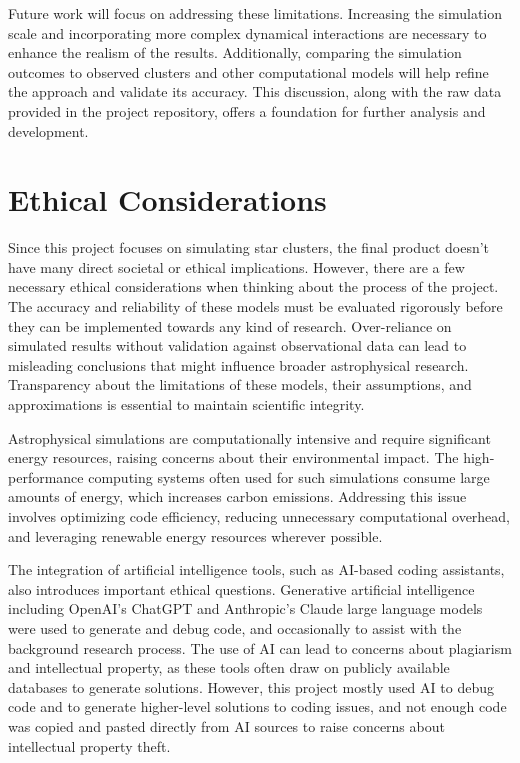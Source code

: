 \documentclass[10pt,twocolumn]{article}
\begin{document}
Future work will focus on addressing these limitations. Increasing the simulation scale and incorporating more complex dynamical interactions are necessary to enhance the realism of the results. Additionally, comparing the simulation outcomes to observed clusters and other computational models will help refine the approach and validate its accuracy. This discussion, along with the raw data provided in the project repository, offers a foundation for further analysis and development.

\section{Ethical Considerations}
Since this project focuses on simulating star clusters, the final product doesn’t have many direct societal or ethical implications. However, there are a few necessary ethical considerations when thinking about the process of the project. The accuracy and reliability of these models must be evaluated rigorously before they can be implemented towards any kind of research. Over-reliance on simulated results without validation against observational data can lead to misleading conclusions that might influence broader astrophysical research. Transparency about the limitations of these models, their assumptions, and approximations is essential to maintain scientific integrity.

Astrophysical simulations are computationally intensive and require significant energy resources, raising concerns about their environmental impact. The high-performance computing systems often used for such simulations consume large amounts of energy, which increases carbon emissions. Addressing this issue involves optimizing code efficiency, reducing unnecessary computational overhead, and leveraging renewable energy resources wherever possible.

The integration of artificial intelligence tools, such as AI-based coding assistants, also introduces important ethical questions. Generative artificial intelligence including OpenAI’s ChatGPT and Anthropic’s Claude large language models were used to generate and debug code, and occasionally to assist with the background research process. The use of AI can lead to concerns about plagiarism and intellectual property, as these tools often draw on publicly available databases to generate solutions. However, this project mostly used AI to debug code and to generate higher-level solutions to coding issues, and not enough code was copied and pasted directly from AI sources to raise concerns about intellectual property theft.
\end{document}
